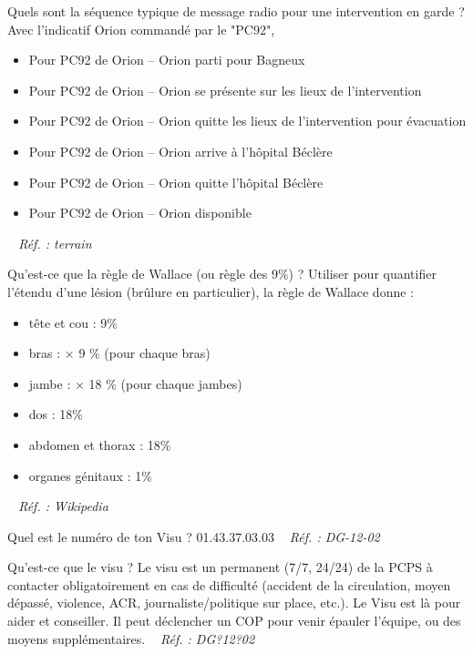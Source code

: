 \documentclass[grid,avery5371,landscape]{flashcards}
\makeatletter
\newcounter{nocarte}
\newcommand{\categ}[1]{%
  \def\@categ{#1}%
  \setcounter{nocarte}{0}%
}
\newcommand{\source}[1]{%
  \medskip
  \itshape%
   ~ \hfill Réf. : #1}
\makeatother
\begin{document}
\color[HTML]{01DF01}
\categ{CE-CP-REG}
\begin{flashcard}[administratif]{
 Quels sont la séquence typique de message radio pour une intervention en garde ?   }
      Avec l'indicatif Orion commandé par le "PC92",     
\begin{itemize}       
\item Pour PC92 de Orion -- Orion parti pour Bagneux        
\item Pour PC92 de Orion -- Orion se présente sur les lieux de l'intervention        
\item Pour PC92 de Orion -- Orion quitte les lieux de l'intervention pour évacuation        
\item Pour PC92 de Orion -- Orion arrive à l'hôpital Béclère         
\item Pour PC92 de Orion -- Orion quitte l'hôpital Béclère        
\item Pour PC92 de Orion -- Orion disponible
    \end{itemize}
  \source{terrain}
\end{flashcard}


\color[HTML]{01DF01}
\categ{CE-CP-REG}
\begin{flashcard}[bilan]{
 Qu'est-ce que la règle de Wallace (ou règle des 9\%) ?   }
  Utiliser pour quantifier l'étendu d'une lésion (brûlure en particulier), la règle de Wallace donne :
   \begin{itemize}        \item tête et cou : 9\%        \item bras : $\times$ 9 \% (pour chaque bras)        \item jambe : $\times$ 18 \% (pour chaque jambes)        \item dos : 18\%        \item abdomen et thorax : 18\%        \item organes génitaux : 1\%    \end{itemize}
  \source{Wikipedia}
\end{flashcard}


\color[HTML]{01DF01}
\categ{CE-CP-REG}
\begin{flashcard}[administratif]{
 Quel est le numéro de ton Visu ?   }
  01.43.37.03.03
  \source{DG-12-02}
\end{flashcard}


\color[HTML]{01DF01}
\categ{CE-CP-REG}
\begin{flashcard}[administratif]{
 Qu'est-ce que le visu ?   }
  Le visu est un permanent (7/7, 24/24) de la PCPS à contacter obligatoirement en cas de difficulté (accident de la circulation, moyen dépassé, violence, ACR, journaliste/politique sur place, etc.). Le Visu est là pour aider et conseiller. Il peut déclencher un COP pour venir épauler l'équipe, ou des moyens supplémentaires.
  \source{DG?12?02}
\end{flashcard}
\end{document}

